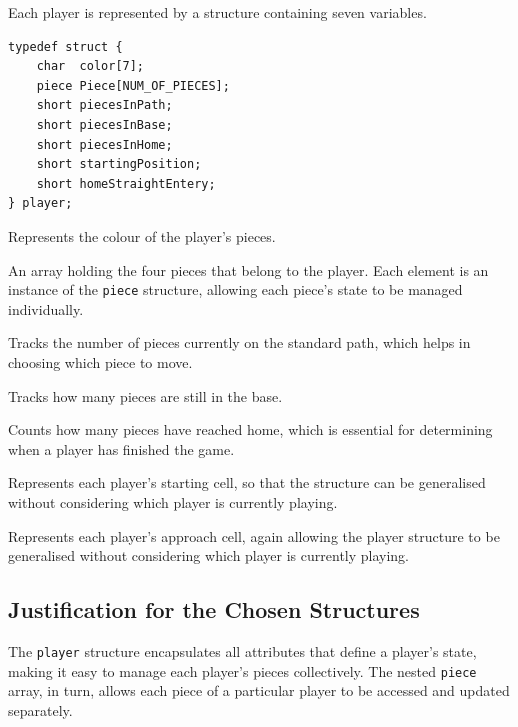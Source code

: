 \documentclass[11pt,a4paper]{article}
\newcommand{\code}[1]{\texttt{#1}}
\begin{document}
Each player is represented by a structure containing seven variables.

\begin{lstlisting}
typedef struct {
    char  color[7];
    piece Piece[NUM_OF_PIECES];
    short piecesInPath;
    short piecesInBase;
    short piecesInHome;
    short startingPosition;
    short homeStraightEntery;
} player;
\end{lstlisting}

\begin{description}[style=nextline, leftmargin=1.5em]
  \item[\code{color}]
    Represents the colour of the player's pieces.

  \item[\code{Piece}]
    An array holding the four pieces that belong to the player. Each element is
    an instance of the \code{piece} structure, allowing each piece's state to be
    managed individually.

  \item[\code{piecesInPath}]
    Tracks the number of pieces currently on the standard path, which helps in
    choosing which piece to move.

  \item[\code{piecesInBase}]
    Tracks how many pieces are still in the base.

  \item[\code{piecesInHome}]
    Counts how many pieces have reached home, which is essential for determining
    when a player has finished the game.

  \item[\code{startingPosition}]
    Represents each player's starting cell, so that the structure can be
    generalised without considering which player is currently playing.

  \item[\code{homeStraightEntery}]
    Represents each player's approach cell, again allowing the player structure
    to be generalised without considering which player is currently playing.
\end{description}

\subsection{Justification for the Chosen Structures}

The \code{player} structure encapsulates all attributes that define a player's
state, making it easy to manage each player's pieces collectively. The nested
\code{piece} array, in turn, allows each piece of a particular player to be
accessed and updated separately.
\end{document}
